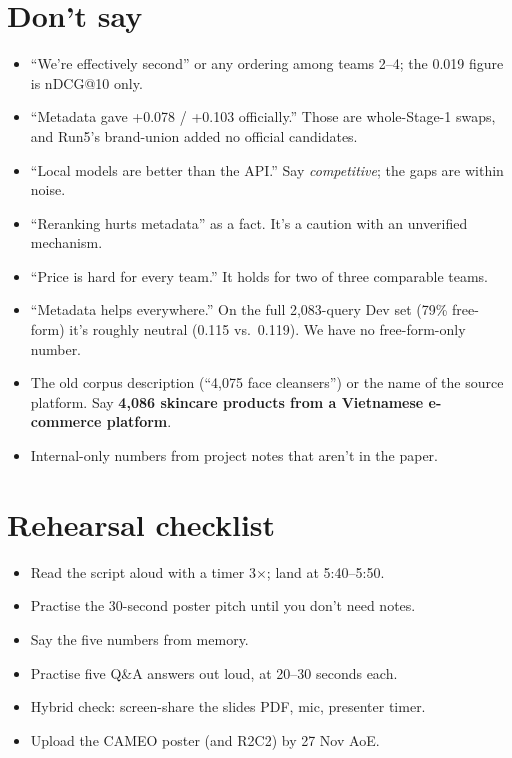 \documentclass[11pt]{article}
\begin{document}
\section{Don't say}
\begin{caution}
\begin{itemize}
  \item ``We're effectively second'' or any ordering among teams 2--4; the 0.019 figure
        is nDCG@10 only.
  \item ``Metadata gave +0.078 / +0.103 officially.'' Those are whole-Stage-1 swaps, and
        Run5's brand-union added no official candidates.
  \item ``Local models are better than the API.'' Say \emph{competitive}; the gaps are within noise.
  \item ``Reranking hurts metadata'' as a fact. It's a caution with an unverified mechanism.
  \item ``Price is hard for every team.'' It holds for two of three comparable teams.
  \item ``Metadata helps everywhere.'' On the full 2,083-query Dev set (79\% free-form) it's
        roughly neutral (0.115 vs.\ 0.119). We have no free-form-only number.
  \item The old corpus description (``4,075 face cleansers'') or the name of the source
        platform. Say \textbf{4,086 skincare products from a Vietnamese e-commerce platform}.
  \item Internal-only numbers from project notes that aren't in the paper.
\end{itemize}
\end{caution}

\section{Rehearsal checklist}
\begin{itemize}
  \item[$\square$] Read the script aloud with a timer 3$\times$; land at 5:40--5:50.
  \item[$\square$] Practise the 30-second poster pitch until you don't need notes.
  \item[$\square$] Say the five numbers from memory.
  \item[$\square$] Practise five Q\&A answers out loud, at 20--30 seconds each.
  \item[$\square$] Hybrid check: screen-share the slides PDF, mic, presenter timer.
  \item[$\square$] Upload the CAMEO poster (and R2C2) by 27 Nov AoE.
\end{itemize}
\end{document}
